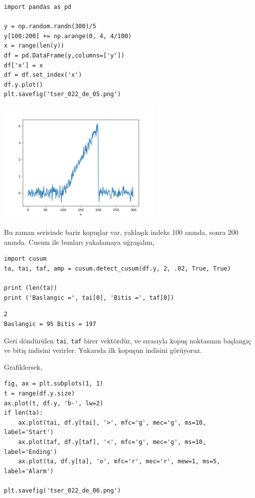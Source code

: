 \documentclass[12pt,fleqn]{article}\usepackage{../../common}
\begin{document}
\begin{verbatim}
import pandas as pd
  
y = np.random.randn(300)/5
y[100:200] += np.arange(0, 4, 4/100)
x = range(len(y))
df = pd.DataFrame(y,columns=['y'])
df['x'] = x
df = df.set_index('x')
df.y.plot()
plt.savefig('tser_022_de_05.png')
\end{verbatim}

\includegraphics[height=6cm]{tser_022_de_05.png}

Bu zaman serisinde bariz kopuşlar var, yaklaşık indeks 100 anında, sonra
200 anında. Cusum ile bunları yakalamaya uğraşalım,

\begin{verbatim}
import cusum
ta, tai, taf, amp = cusum.detect_cusum(df.y, 2, .02, True, True)

print (len(ta))
print ('Baslangic =', tai[0], 'Bitis =', taf[0])
\end{verbatim}

\begin{verbatim}
2
Baslangic = 95 Bitis = 197
\end{verbatim}

Geri döndürülen \verb!tai!, \verb!taf! birer vektördür, ve sırasıyla kopuş
noktasının başlangıç ve bitiş indisini verirler. Yukarıda ilk kopuşun
indisini görüyoruz.

Grafiklersek,

\begin{verbatim}
fig, ax = plt.subplots(1, 1)
t = range(df.y.size)
ax.plot(t, df.y, 'b-', lw=2)
if len(ta):
    ax.plot(tai, df.y[tai], '>', mfc='g', mec='g', ms=10, label='Start')
    ax.plot(taf, df.y[taf], '<', mfc='g', mec='g', ms=10, label='Ending')
    ax.plot(ta, df.y[ta], 'o', mfc='r', mec='r', mew=1, ms=5, label='Alarm')
    
plt.savefig('tser_022_de_06.png')
\end{verbatim}
\end{document}
